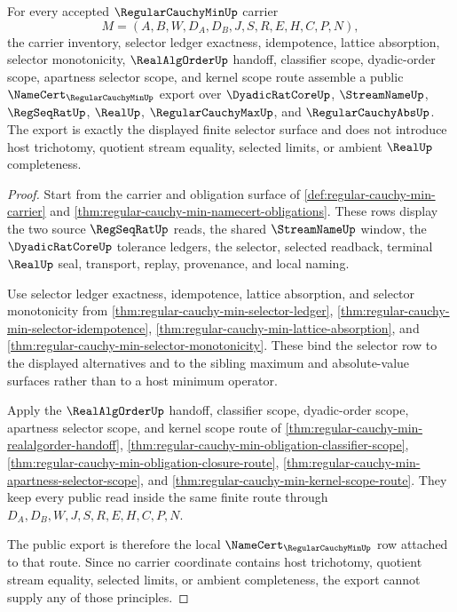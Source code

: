 \begin{theorem}
\label{thm:regular-cauchy-min-public-namecert}
For every accepted $\RegularCauchyMinUp$ carrier
$$
M=(A,B,W,D_A,D_B,J,S,R,E,H,C,P,N),
$$
the carrier inventory, selector ledger exactness, idempotence, lattice absorption, selector monotonicity, $\RealAlgOrderUp$ handoff, classifier scope, dyadic-order scope, apartness selector scope, and kernel scope route assemble a public $\NameCert_{\RegularCauchyMinUp}$ export over $\DyadicRatCoreUp$, $\StreamNameUp$, $\RegSeqRatUp$, $\RealUp$, $\RegularCauchyMaxUp$, and $\RegularCauchyAbsUp$. The export is exactly the displayed finite selector surface and does not introduce host trichotomy, quotient stream equality, selected limits, or ambient $\RealUp$ completeness.
\end{theorem}
\begin{proof}
Start from the carrier and obligation surface of \autoref{def:regular-cauchy-min-carrier} and \autoref{thm:regular-cauchy-min-namecert-obligations}. These rows display the two source $\RegSeqRatUp$ reads, the shared $\StreamNameUp$ window, the $\DyadicRatCoreUp$ tolerance ledgers, the selector, selected readback, terminal $\RealUp$ seal, transport, replay, provenance, and local naming.

Use selector ledger exactness, idempotence, lattice absorption, and selector monotonicity from \autoref{thm:regular-cauchy-min-selector-ledger}, \autoref{thm:regular-cauchy-min-selector-idempotence}, \autoref{thm:regular-cauchy-min-lattice-absorption}, and \autoref{thm:regular-cauchy-min-selector-monotonicity}. These bind the selector row to the displayed alternatives and to the sibling maximum and absolute-value surfaces rather than to a host minimum operator.

Apply the $\RealAlgOrderUp$ handoff, classifier scope, dyadic-order scope, apartness selector scope, and kernel scope route of \autoref{thm:regular-cauchy-min-realalgorder-handoff}, \autoref{thm:regular-cauchy-min-obligation-classifier-scope}, \autoref{thm:regular-cauchy-min-obligation-closure-route}, \autoref{thm:regular-cauchy-min-apartness-selector-scope}, and \autoref{thm:regular-cauchy-min-kernel-scope-route}. They keep every public read inside the same finite route through $D_A,D_B,W,J,S,R,E,H,C,P,N$.

The public export is therefore the local $\NameCert_{\RegularCauchyMinUp}$ row attached to that route. Since no carrier coordinate contains host trichotomy, quotient stream equality, selected limits, or ambient completeness, the export cannot supply any of those principles.
\end{proof}

